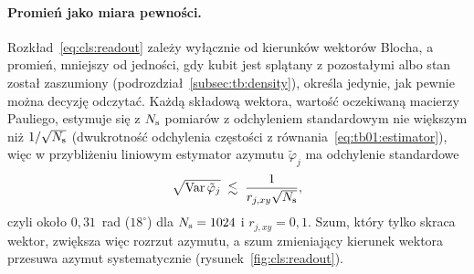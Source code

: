 \paragraph{Promień jako miara pewności.}
Rozkład~\eqref{eq:cls:readout} zależy wyłącznie od kierunków wektorów Blocha, a promień, mniejszy od jedności, gdy kubit jest splątany z pozostałymi albo stan został zaszumiony (podrozdział~\ref{subsec:tb:density}), określa jedynie, jak pewnie można decyzję odczytać.
Każdą składową wektora, wartość oczekiwaną macierzy Pauliego, estymuje się z $N_{\mathrm{s}}$ pomiarów z odchyleniem standardowym nie większym niż $1/\sqrt{N_{\mathrm{s}}}$ (dwukrotność odchylenia częstości z równania~\eqref{eq:tb01:estimator}), więc w przybliżeniu liniowym estymator azymutu $\tilde{\varphi}_j$ ma odchylenie standardowe
\begin{equation}\label{eq:cls:azimuth-noise}
\sqrt{\mathrm{Var}\,\tilde{\varphi}_j}\;\lesssim\;\frac{1}{r_{j,xy}\sqrt{N_{\mathrm{s}}}},
\end{equation}
czyli około $0{,}31$~rad ($18^{\circ}$) dla $N_{\mathrm{s}}=1024$ i $r_{j,xy}=0{,}1$.
Szum, który tylko skraca wektor, zwiększa więc rozrzut azymutu, a szum zmieniający kierunek wektora przesuwa azymut systematycznie (rysunek~\ref{fig:cls:readout}).

